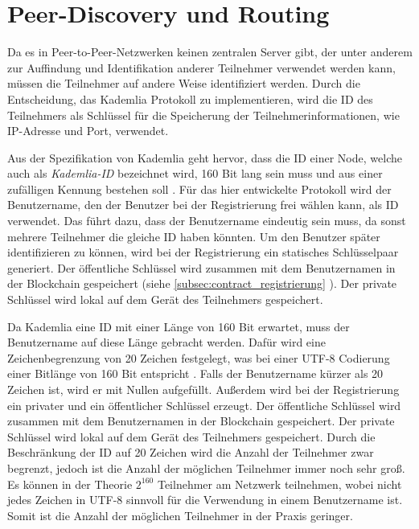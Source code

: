 \section{Peer-Discovery und Routing}
\label{subsec:identifikation_von_teilnehmern}

Da es in Peer-to-Peer-Netzwerken keinen zentralen Server gibt, der unter anderem zur Auffindung und Identifikation anderer Teilnehmer verwendet werden kann, müssen die Teilnehmer auf andere Weise identifiziert werden. Durch die Entscheidung, das Kademlia Protokoll zu implementieren, wird die ID des Teilnehmers als Schlüssel für die Speicherung der Teilnehmerinformationen, wie IP-Adresse und Port, verwendet.

Aus der Spezifikation von Kademlia geht hervor, dass die ID einer Node, welche auch als \textit{Kademlia-ID} bezeichnet wird, 160 Bit lang sein muss und aus einer zufälligen Kennung bestehen soll \parencite[S. 2]{Maymounkov_Kademlia}. Für das hier entwickelte Protokoll wird der Benutzername, den der Benutzer bei der Registrierung frei wählen kann, als ID verwendet. Das führt dazu, dass der Benutzername eindeutig sein muss, da sonst mehrere Teilnehmer die gleiche ID haben könnten. Um den Benutzer später identifizieren zu können, wird bei der Registrierung ein statisches Schlüsselpaar generiert. Der öffentliche Schlüssel wird zusammen mit dem Benutzernamen in der Blockchain gespeichert (siehe \ref{subsec:contract_registrierung} \textit{}). Der private Schlüssel wird lokal auf dem Gerät des Teilnehmers gespeichert. 

Da Kademlia eine ID mit einer Länge von 160 Bit erwartet, muss der Benutzername auf diese Länge gebracht werden. Dafür wird eine Zeichenbegrenzung von 20 Zeichen festgelegt, was bei einer UTF-8 Codierung einer Bitlänge von 160 Bit entspricht \parencite{rfc3629_utf-8}. Falls der Benutzername kürzer als 20 Zeichen ist, wird er mit Nullen aufgefüllt.
Außerdem wird bei der Registrierung ein privater und ein öffentlicher Schlüssel erzeugt. Der öffentliche Schlüssel wird zusammen mit dem Benutzernamen in der Blockchain gespeichert. Der private Schlüssel wird lokal auf dem Gerät des Teilnehmers gespeichert. Durch die Beschränkung der ID auf 20 Zeichen wird die Anzahl der Teilnehmer zwar begrenzt, jedoch ist die Anzahl der möglichen Teilnehmer immer noch sehr groß. Es können in der Theorie $2^{160}$ Teilnehmer am Netzwerk teilnehmen, wobei nicht jedes Zeichen in UTF-8 sinnvoll für die Verwendung in einem Benutzername ist. Somit ist die Anzahl der möglichen Teilnehmer in der Praxis geringer.

